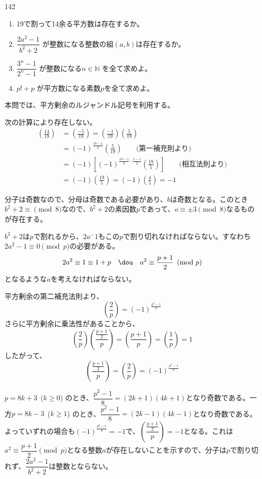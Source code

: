 \begin{prob}{142}{}{}
 \begin{enumerate}
  \item 19で割って14余る平方数は存在するか。 
  \item $\dfrac{2a^2-1}{b^2+2}$ が整数になる整数の組$(a,b)$は存在するか。 
  \item $\dfrac{3^n-1}{2^n-1}$ が整数になる$n\in\mathbb{N}$ を全て求めよ。 
  \item $p!+p$ が平方数になる素数$p$を全て求めよ。 
 \end{enumerate}
\end{prob}

本問では、平方剰余のルジャンドル記号を利用する。

次の計算により存在しない。
\begin{align*}
 \left(\frac{14}{19}\right) &= \left(\frac{-5}{19}\right) = \left(\frac{-1}{19}\right)\left(\frac{5}{19}\right) \\
 &= (-1)^{\frac{19-1}{2}}\left(\frac{5}{19}\right) \quad\quad\text{(第一補充則より)} \\
 &= (-1)\left[(-1)^{\frac{19-1}{2}\cdot\frac{5-1}{2}}\left(\frac{19}{5}\right)\right] \quad\quad\text{(相互法則より)} \\
 &=(-1)\left(\frac{19}{5}\right) = (-1)\left(\frac{4}{5}\right) = -1
\end{align*}

分子は奇数なので、分母は奇数である必要があり、$b$は奇数となる。このとき$b^2+2\equiv\pmod{8}$なので、$b^2+2$の素因数$p$であって、$o\equiv\pm 3 \pmod{8}$なるものが存在する。

$b^2+2$は$p$で割れるから、$2a^-1$もこの$p$で割り切れなければならない。すなわち$2a^2-1\equiv 0\pmod{p}$の必要がある。
\[ 2a^2\equiv 1\equiv 1+p \quad\dou\quad a^2\equiv \frac{p+1}{2} \pmod{p} \]
となるような$a$を考えなければならない。

平方剰余の第二補充法則より、
\[ \left(\frac{2}{p}\right)=\left(-1\right)^{\frac{p^2-1}{8}} \]
さらに平方剰余に乗法性があることから、
\[ \left(\frac{2}{p}\right)\left(\frac{\frac{p+1}{2}}{p}\right)=\left(\frac{p+1}{p}\right)=\left(\frac{1}{p}\right)=1 \]
したがって、
\[ \left(\frac{\frac{p+1}{2}}{p}\right)=\left(\frac{2}{p}\right)=\left(-1\right)^{\frac{p^2-1}{8}} \]

$p=8k+3$~($k\ge 0$) のとき、$\dfrac{p^2-1}{8}=(2k+1)(4k+1)$となり奇数である。一方$p=8k-3$~($k\ge 1$) のとき、$\dfrac{p^2-1}{8}=(2k-1)(4k-1)$となり奇数である。よっていずれの場合も$\left(-1\right)^\frac{p^2-1}{8}=-1$で、$\left(\dfrac{\frac{p+1}{2}}{p}\right)=-1$となる。これは$a^2\equiv \dfrac{p+1}{2} \pmod{p}$となる整数$a$が存在しないことを示すので、分子は$p$で割り切れず、$\dfrac{2a^2-1}{b^2+2}$は整数とならない。

